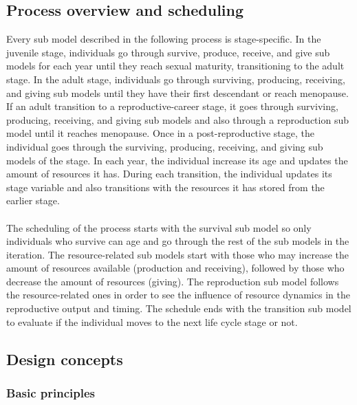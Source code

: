 \documentclass{article}
\begin{document}
\subsection{Process overview and scheduling}

Every sub model described in the following process is stage-specific. In the juvenile stage, individuals go through survive, produce, receive, and give sub models for each year until they reach sexual maturity, transitioning to the adult stage. In the adult stage, individuals go through surviving, producing, receiving, and giving sub models until they have their first descendant or reach menopause. If an adult transition to a reproductive-career stage, it goes through surviving, producing, receiving, and giving sub models and also through a reproduction sub model until it reaches menopause. Once in a post-reproductive stage, the individual goes through the surviving, producing, receiving, and giving sub models of the stage. In each year, the individual increase its age and updates the amount of resources it has. During each transition, the individual updates its stage variable and also transitions with the resources it has stored from the earlier stage.
\\\\
The scheduling of the process starts with the survival sub model so only individuals who survive can age and go through the rest of the sub models in the iteration. The resource-related sub models start with those who may increase the amount of resources available (production and receiving), followed by those who decrease the amount of resources (giving). The reproduction sub model follows the resource-related ones in order to see the influence of resource dynamics in the reproductive output and timing. The schedule ends with the transition sub model to evaluate if the individual moves to the next life cycle stage or not.

\subsection{Design concepts}

\subsubsection{Basic principles}
\end{document}
